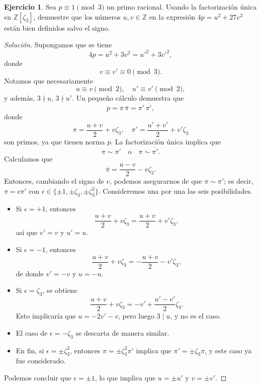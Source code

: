 \documentclass{article}
\newcounter{tarea}
\theoremstyle{definition}
\newtheorem{ejercicio}{Ejercicio}[tarea]
\newenvironment{solucion}{\begin{proof}[Solución]}{\end{proof}}
\begin{document}
\begin{ejercicio}
  Sea $p \equiv 1 \pmod{3}$ un primo racional. Usando la factorización única en
  $\mathbb{Z} [\zeta_3]$, demuestre que los números $u,v \in \mathbb{Z}$ en la
  expresión $4p = u^2 + 27 v^2$ están bien definidos salvo el signo.

  \ifdefined\solutions
  \begin{solucion}
    Supongamos que se tiene
    $$4p = u^2 + 3 v^2 = u'^2 + 3 v'^2,$$
    donde
    $$v \equiv v' \equiv 0 \pmod{3}.$$
    Notamos que necesariamente
    $$u \equiv v\pmod{2}, \quad u' \equiv v'\pmod{2},$$
    y además, $3 \nmid u$, $3 \nmid u'$. Un pequeño cálculo demuestra que
    $$p = \pi\,\overline{\pi} = \pi'\,\overline{\pi'},$$
    donde
    $$\pi = \frac{u+v}{2} + v\zeta_3, \quad \pi' = \frac{u'+v'}{2} + v'\zeta_3$$
    son primos, ya que tienen norma $p$. La factorización única implica que
    $$\pi \sim \pi' \quad\text{o}\quad \pi \sim \overline{\pi'}.$$
    Calculamos que
    $$\overline{\pi} = \frac{u-v}{2} - v\zeta_3.$$
    Entonces, cambiando el signo de $v$, podemos asegurarnos de que
    $\pi \sim \pi'$; es decir, $\pi = \epsilon \pi'$ con
    $\epsilon \in \{ \pm 1, \pm \zeta_3, \pm \zeta_3^2 \}$.
    Consideremos una por una las seis posibilidades.

    \begin{itemize}
      \item Si $\epsilon = +1$, entonces
        $$\frac{u+v}{2} + v\zeta_3 = \frac{u+v}{2} + v'\zeta_3,$$
        así que $v' = v$ y $u' = u$.

      \item Si $\epsilon = -1$, entonces
        $$\frac{u+v}{2} + v\zeta_3 = -\frac{u+v}{2} - v'\zeta_3,$$
        de donde $v' = -v$ y $u = -u$.

      \item Si $\epsilon = \zeta_3$, se obtiene
        $$\frac{u+v}{2} + v\zeta_3 = -v' + \frac{u'-v'}{2}\zeta_3.$$
        Esto implicaría que $u = -2v' - v$, pero luego $3 \mid u$,
        y no es el caso.

      \item El caso de $\epsilon = -\zeta_3$ se descarta de manera similar.

      \item En fin, si $\epsilon = \pm \zeta_3^2$, entonces
        $\pi = \pm \zeta_3^2 \pi'$ implica que $\pi' = \pm\zeta_3\pi$, y este
        caso ya fue considerado.
    \end{itemize}

    Podemos concluir que $\epsilon = \pm 1$, lo que implica que $u = \pm u'$
    y $v = \pm v'$.
  \end{solucion}
  \fi
\end{ejercicio}
\end{document}
